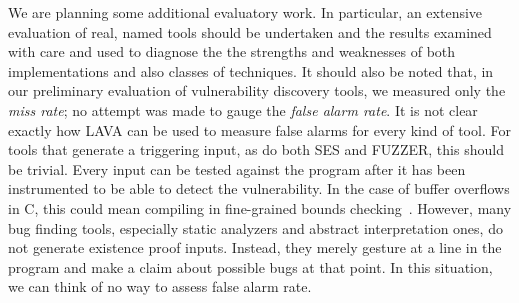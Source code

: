 We are planning some additional evaluatory work.  
In particular, an extensive evaluation of real, named tools should be undertaken and the results examined with care and used to diagnose the the strengths and weaknesses of both implementations and also classes of techniques.
It should also be noted that, in our preliminary evaluation of vulnerability discovery tools, we measured only the \emph{miss rate}; no attempt was made to gauge the \emph{false alarm rate}.
It is not clear exactly how LAVA can be used to measure false alarms for every kind of tool.
For tools that generate a triggering input, as do both SES and FUZZER, this should be trivial. 
Every input can be tested against the program after it has been instrumented to be able to detect the vulnerability.
In the case of buffer overflows in C, this could mean compiling in fine-grained bounds checking~\cite{ruwase2004practical}.
However, many bug finding tools, especially static analyzers and abstract interpretation ones, do not generate existence proof inputs.
Instead, they merely gesture at a line in the program and make a claim about possible bugs at that point.
In this situation, we can think of no way to assess false alarm rate.

